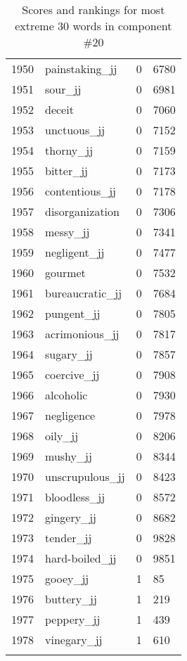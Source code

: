 \begin{longtable}[!htbp]{| rlr@{.}l |}
    1950 & painstaking\_jj & 0 & 6780 \\
    1951 & sour\_jj & 0 & 6981 \\
    1952 & deceit & 0 & 7060 \\
    1953 & unctuous\_jj & 0 & 7152 \\
    1954 & thorny\_jj & 0 & 7159 \\
    1955 & bitter\_jj & 0 & 7173 \\
    1956 & contentious\_jj & 0 & 7178 \\
    1957 & disorganization & 0 & 7306 \\
    1958 & messy\_jj & 0 & 7341 \\
    1959 & negligent\_jj & 0 & 7477 \\
    1960 & gourmet & 0 & 7532 \\
    1961 & bureaucratic\_jj & 0 & 7684 \\
    1962 & pungent\_jj & 0 & 7805 \\
    1963 & acrimonious\_jj & 0 & 7817 \\
    1964 & sugary\_jj & 0 & 7857 \\
    1965 & coercive\_jj & 0 & 7908 \\
    1966 & alcoholic & 0 & 7930 \\
    1967 & negligence & 0 & 7978 \\
    1968 & oily\_jj & 0 & 8206 \\
    1969 & mushy\_jj & 0 & 8344 \\
    1970 & unscrupulous\_jj & 0 & 8423 \\
    1971 & bloodless\_jj & 0 & 8572 \\
    1972 & gingery\_jj & 0 & 8682 \\
    1973 & tender\_jj & 0 & 9828 \\
    1974 & hard-boiled\_jj & 0 & 9851 \\
    1975 & gooey\_jj & 1 & 85 \\
    1976 & buttery\_jj & 1 & 219 \\
    1977 & peppery\_jj & 1 & 439 \\
    1978 & vinegary\_jj & 1 & 610 \\
    \hline
    \caption{Scores and rankings for most extreme 30 words in component \#20} \\
\end{longtable}
